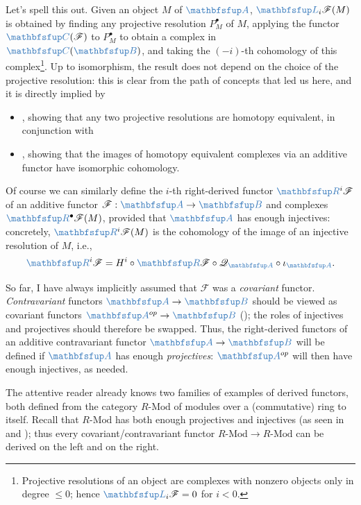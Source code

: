 Let's spell this out. Given an object $M$ of $\categ{A}$,
$\categ{L}_i\mathscr{F}(M)$ is obtained by finding any projective
resolution $P^\bullet_M$ of $M$, applying the functor
$\categ{C}(\mathscr{F})$ to $P^\bullet_M$ to obtain a complex in
$\categ{C}(\categ{B})$, and taking the $(-i)$-th cohomology of this
complex\footnote{Projective resolutions of an object are complexes
  with nonzero objects only in degree $\le 0$; hence
  $\categ{L}_i\mathscr{F} = 0$ for $i < 0$.}. Up to isomorphism, the
result does not depend on the choice of the projective resolution:
this is clear from the path of concepts that led us here, and it is
directly implied by
\begin{itemize}
\item {}, showing that any two projective
  resolutions are homotopy equivalent, in conjunction with
\item {}, showing that the images of homotopy
  equivalent complexes via an additive functor have isomorphic
  cohomology.
\end{itemize}

Of course we can similarly define the $i$-th right-derived functor
$\categ{R}^i\mathscr{F}$ of an additive functor
$\mathscr{F} : \categ{A} \to \categ{B}$ and complexes
$\categ{R}^\bullet \mathscr{F}(M)$, provided that $\categ{A}$ has
enough injectives: concretely, $\categ{R}^i\mathscr{F}(M)$ is the
cohomology of the image of an injective resolution of $M$, i.e.,
\[
  \categ{R}^i\mathscr{F} = H^i \circ \categ{R}\mathscr{F} \circ
  \mathscr{Q}_{\categ{A}} \circ \iota_{\categ{A}}.
\]

So far, I have always implicitly assumed that $\mathscr{F}$ was a
\emph{covariant} functor. \emph{Contravariant} functors
$\categ{A} \to \categ{B}$ should be viewed as covariant functors
$\categ{A}^{op} \to \categ{B}$ (); the roles of
injectives and projectives should therefore be swapped. Thus, the
right-derived functors of an additive contravariant functor
$\categ{A} \to \categ{B}$ will be defined if $\categ{A}$ has enough
\emph{projectives}: $\categ{A}^{op}$ will then have enough injectives,
as needed.

The attentive reader already knows two families of examples of derived
functors, both defined from the category $R\text{-Mod}$ of modules
over a (commutative) ring to itself. Recall that $R\text{-Mod}$ has
both enough projectives and injectives (as seen in
 and
); thus every
covariant/contravariant functor $R\text{-Mod} \to R\text{-Mod}$ can be
derived on the left and on the right.

